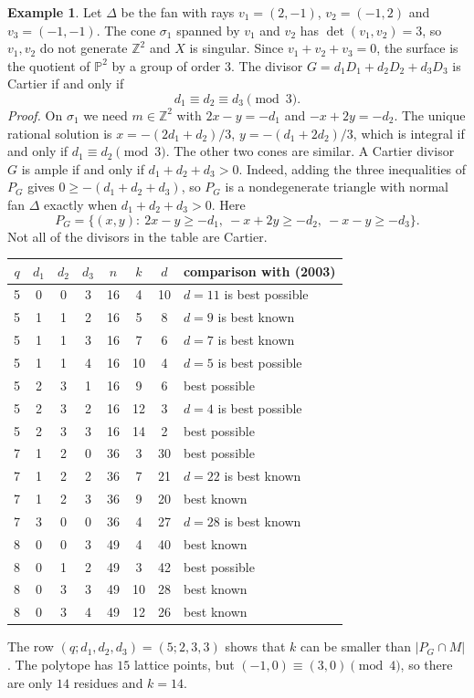 \documentclass[12pt,letterpaper]{article}
\numberwithin{equation}{section}
\theoremstyle{definition}
\newtheorem{example}[theorem]{Example}
\theoremstyle{remark}
\newcommand{\Z}{\mathbb{Z}}
\newcommand{\PP}{\mathbb{P}}
\begin{document}
\begin{example}\label{example:fan1}
Let $\Delta$ be the fan with rays $v_1=(2,-1)$, $v_2=(-1,2)$ and
$v_3=(-1,-1)$. The cone $\sigma_1$ spanned by $v_1$ and $v_2$ has
$\det(v_1,v_2)=3$, so $v_1,v_2$ do not generate $\Z^2$ and $X$ is singular.
Since $v_1+v_2+v_3=0$, the surface is the quotient of $\PP^2$ by a group of
order $3$. The divisor $G=d_1D_1+d_2D_2+d_3D_3$ is Cartier if and only if
\[
d_1\equiv d_2\equiv d_3\pmod 3 .
\]
\emph{Proof.} On $\sigma_1$ we need $m\in\Z^2$ with $2x-y=-d_1$ and
$-x+2y=-d_2$. The unique rational solution is
$x=-(2d_1+d_2)/3$, $y=-(d_1+2d_2)/3$, which is integral if and only if
$d_1\equiv d_2\pmod3$. The other two cones are similar. A Cartier divisor
$G$ is ample if and only if $d_1+d_2+d_3>0$. Indeed, adding the three
inequalities of $P_G$ gives $0\ge-(d_1+d_2+d_3)$, so $P_G$ is a
nondegenerate triangle with normal fan $\Delta$ exactly when
$d_1+d_2+d_3>0$. Here
\[
P_G=\{(x,y):\ 2x-y\ge-d_1,\ -x+2y\ge-d_2,\ -x-y\ge-d_3\}.
\]
Not all of the divisors in the table are Cartier.

\begin{center}
\small
\begin{tabular}{@{}cccccccl@{}}
\toprule
$q$ & $d_1$ & $d_2$ & $d_3$ & $n$ & $k$ & $d$ & comparison with \cite{Br98} (2003)\\
\midrule
5 & 0 & 0 & 3 & 16 & 4 & 10 & $d=11$ is best possible\\
5 & 1 & 1 & 2 & 16 & 5 & 8 & $d=9$ is best known\\
5 & 1 & 1 & 3 & 16 & 7 & 6 & $d=7$ is best known\\
5 & 1 & 1 & 4 & 16 & 10 & 4 & $d=5$ is best possible\\
5 & 2 & 3 & 1 & 16 & 9 & 6 & best possible\\
5 & 2 & 3 & 2 & 16 & 12 & 3 & $d=4$ is best possible\\
5 & 2 & 3 & 3 & 16 & 14 & 2 & best possible\\
7 & 1 & 2 & 0 & 36 & 3 & 30 & best possible\\
7 & 1 & 2 & 2 & 36 & 7 & 21 & $d=22$ is best known\\
7 & 1 & 2 & 3 & 36 & 9 & 20 & best known\\
7 & 3 & 0 & 0 & 36 & 4 & 27 & $d=28$ is best known\\
8 & 0 & 0 & 3 & 49 & 4 & 40 & best known\\
8 & 0 & 1 & 2 & 49 & 3 & 42 & best possible\\
8 & 0 & 3 & 3 & 49 & 10 & 28 & best known\\
8 & 0 & 3 & 4 & 49 & 12 & 26 & best known\\
\bottomrule
\end{tabular}
\end{center}
The row $(q;d_1,d_2,d_3)=(5;2,3,3)$ shows that $k$ can be smaller than
$|P_G\cap M|$. The polytope has $15$ lattice points, but
$(-1,0)\equiv(3,0)\pmod4$, so there are only $14$ residues and $k=14$.
\end{example}
\end{document}
